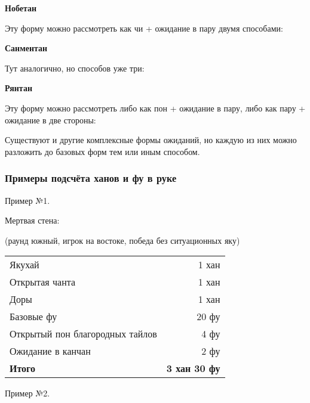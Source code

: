\textbf{Нобетан}


Эту форму можно рассмотреть как чи + ожидание в пару двумя способами:



\textbf{Санментан}


Тут аналогично, но способов уже три:




\textbf{Рянтан}


Эту форму можно рассмотреть либо как пон + ожидание в пару, либо как пару + ожидание в две стороны:



Существуют и другие комплексные формы ожиданий, но каждую из них можно разложить до базовых форм тем или иным способом.

\subsubsection{Примеры подсчёта ханов и фу в руке}

Пример №1.

\hfill {}

Мертвая стена:

(раунд южный, игрок на востоке, победа без ситуационных яку)

\begin{tabular}{lr}
	Якухай & 1 хан \\
	Открытая чанта & 1 хан \\
	Доры & 1 хан \\
	Базовые фу & 20 фу \\
	Открытый пон благородных тайлов & 4 фу \\
	Ожидание в канчан & 2 фу \\
	\hline
	\textbf{Итого} & \textbf{3 хан 30 фу} \\
\end{tabular}

Пример №2.

 \hfill {}

